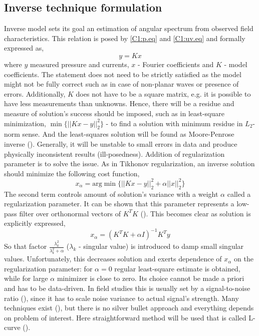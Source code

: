 \subsection{Inverse technique formulation}
Inverse model sets its goal an estimation of angular spectrum from observed field characteristics. This relation is posed by \eqref{C1:p.eq} and \eqref{C1:uv.eq} and formally expressed as,
\begin{equation}
y = K x
\end{equation}
where $y$ measured pressure and currents, $x$ - Fourier coefficients and $K$ - model coefficients. The statement does not need to be strictly satisfied as the model might not be fully correct such as in case of non-planar waves or presence of errors. Additionally, $K$ does not have to be a square matrix, e.g. it is possible to have less measurements than unknowns. Hence, there will be a residue and measure of solution's success should be imposed, such as in least-square minimization, $\min \{ ||K x - y||^2_2 \}$ -  to find a solution with minimum residue in $L_2$-norm sense. And the least-squares solution  will be found as Moore-Penrose inverse (\cite{bennett1992inverse}). Generally, it will be unstable to small errors in data and produce physically inconsistent results (ill-posedness). Addition of regularization parameter is to solve the issue. As in Tikhonov regularization, an inverse solution should minimize the following cost function,
\begin{equation}
\label{C1:Tikh_prob}
x_\alpha = \text{arg}\min\{||K x - y||^2_2 + \alpha ||x||^2_2\}
\end{equation}
The second term controls amount of solution's variance with a weight $\alpha$ called a regularization parameter. It can be shown that this parameter represents a low-pass filter over orthonormal vectors of $K^TK$ (\cite{williams2001regularization}). This becomes clear as solution is explicitly expressed,
\begin{equation}
x_{\alpha} = (K^T K + \alpha I)^{-1} K^T y
\end{equation}
So that factor $\frac{\lambda_k^2}{\lambda_k^2 + \alpha}$ ($\lambda_k$ - singular value) is introduced to damp small singular values. Unfortunately, this decreases solution and exerts dependence of $x_{\alpha}$ on the regularization parameter: for $\alpha = 0$ regular least-square estimate is obtained, while for large $\alpha$ minimizer is close to zero. Its choice cannot be made a priori and has to be data-driven. In field studies this is usually set by a signal-to-noise ratio (\cite{munk2009ocean}), since it has to scale noise variance to actual signal's strength. Many techniques exist (\cite{williams2001regularization}), but there is no silver bullet approach and everything depends on problem of interest. Here straightforward method will be used that is called L-curve (\cite{hansen1993use}).\\
